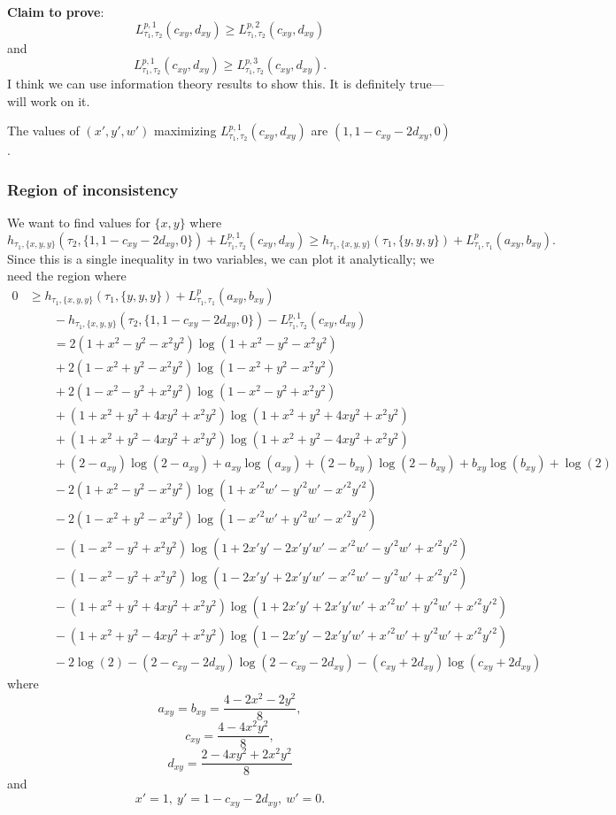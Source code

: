 \documentclass[a4paper]{article}
\begin{document}
\textbf{Claim to prove}:
$$
L^{p,1}_{\tau_1,\tau_2}(c_{xy}, d_{xy}) \ge L^{p,2}_{\tau_1,\tau_2}(c_{xy}, d_{xy})
$$
and
$$
L^{p,1}_{\tau_1,\tau_2}(c_{xy}, d_{xy}) \ge L^{p,3}_{\tau_1,\tau_2}(c_{xy}, d_{xy}).
$$
I think we can use information theory results to show this.
It is definitely true---will work on it.

The values of $(x', y', w')$ maximizing $L^{p,1}_{\tau_1,\tau_2}(c_{xy}, d_{xy})$ are $(1, 1-c_{xy}-2d_{xy},0)$.

\subsubsection{Region of inconsistency}

We want to find values for $\{x,y\}$ where
$$
h_{\tau_1,\{x,y,y\}}(\tau_2,\{1, 1-c_{xy}-2d_{xy}, 0\}) + L^{p,1}_{\tau_1,\tau_2}(c_{xy},d_{xy}) \ge h_{\tau_1,\{x,y,y\}}(\tau_1,\{y, y, y\}) + L^{p}_{\tau_1,\tau_1}(a_{xy},b_{xy}).
$$
Since this is a single inequality in two variables, we can plot it analytically; we need the region where
\begin{align*}
    0 &\ge h_{\tau_1,\{x,y,y\}}(\tau_1,\{y, y, y\}) + L^{p}_{\tau_1,\tau_1}(a_{xy},b_{xy}) \\
      &\qquad - h_{\tau_1,\{x,y,y\}}(\tau_2,\{1, 1-c_{xy}-2d_{xy}, 0\}) - L^{p,1}_{\tau_1,\tau_2}(c_{xy},d_{xy}) \\
%
      &\qquad = 2(1+x^2-y^2-x^2y^2)\log(1+x^2-y^2-x^2y^2) \\
      &\qquad + 2(1-x^2+y^2-x^2y^2)\log(1-x^2+y^2-x^2y^2) \\
      &\qquad + 2(1-x^2-y^2+x^2y^2)\log(1-x^2-y^2+x^2y^2) \\
      &\qquad + (1+x^2+y^2+4xy^2+x^2y^2)\log(1+x^2+y^2+4xy^2+x^2y^2) \\
      &\qquad + (1+x^2+y^2-4xy^2+x^2y^2)\log(1+x^2+y^2-4xy^2+x^2y^2) \\
%
      &\qquad + (2-a_{xy})\log(2-a_{xy})+a_{xy}\log(a_{xy})+(2-b_{xy})\log(2-b_{xy})+b_{xy}\log(b_{xy})+\log(2) \\
%
      &\qquad - 2(1+x^2-y^2-x^2y^2)\log(1+x'^2w'-y'^2w'-x'^2y'^2) \\
      &\qquad - 2(1-x^2+y^2-x^2y^2)\log(1-x'^2w'+y'^2w'-x'^2y'^2) \\
      &\qquad - (1-x^2-y^2+x^2y^2)\log(1+2x'y'-2x'y'w'-x'^2w'-y'^2w'+x'^2y'^2) \\
      &\qquad - (1-x^2-y^2+x^2y^2)\log(1-2x'y'+2x'y'w'-x'^2w'-y'^2w'+x'^2y'^2) \\
      &\qquad - (1+x^2+y^2+4xy^2+x^2y^2)\log(1+2x'y'+2x'y'w'+x'^2w'+y'^2w'+x'^2y'^2) \\
      &\qquad - (1+x^2+y^2-4xy^2+x^2y^2)\log(1-2x'y'-2x'y'w'+x'^2w'+y'^2w'+x'^2y'^2) \\
%
      &\qquad - 2\log(2)-(2-c_{xy}-2d_{xy})\log(2-c_{xy}-2d_{xy})-(c_{xy}+2d_{xy})\log(c_{xy}+2d_{xy})
\end{align*}
where
$$
a_{xy} = b_{xy} = \frac{4-2x^2-2y^2}{8},
$$
$$
c_{xy} = \frac{4-4x^2y^2}{8},
$$
$$
d_{xy} = \frac{2-4xy^2+2x^2y^2}{8}
$$
and
$$
x' = 1, \ y' = 1-c_{xy}-2d_{xy}, \ w' = 0.
$$
\end{document}
